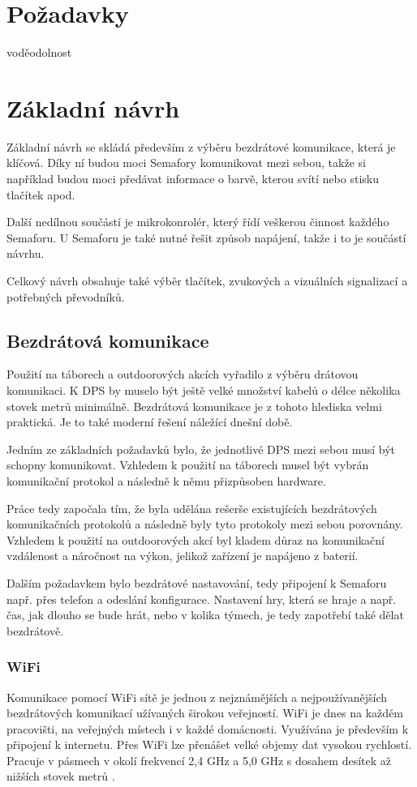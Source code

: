 \chapter{Požadavky}
voděodolnost


\chapter{Základní návrh}
Základní návrh se skládá především z výběru bezdrátové komunikace, která je klíčová. Díky ní budou moci Semafory komunikovat mezi 
sebou, takže si například budou moci předávat informace o barvě, kterou svítí nebo stisku tlačítek apod. 

Další nedílnou součástí je mikrokonrolér, který řídí veškerou činnost každého Semaforu. U Semaforu je také nutné řešit způsob napájení,
takže i to je součástí návrhu.

Celkový návrh obsahuje také výběr tlačítek, zvukových a vizuálních signalizací a potřebných převodníků. 


\section{Bezdrátová komunikace}
Použití na táborech a outdoorových akcích vyřadilo z výběru drátovou komunikaci. K DPS by muselo být ještě velké množství kabelů 
o délce několika stovek metrů minimálně. Bezdrátová komunikace je z tohoto hlediska velmi praktická. Je to také moderní řešení 
náležící dnešní době. 

Jedním ze základních požadavků bylo, že jednotlivé DPS mezi sebou musí být schopny komunikovat. Vzhledem k použití na táborech 
musel být vybrán komunikační protokol a následně k němu přizpůsoben hardware. 

Práce tedy započala tím, že byla udělána rešerše existujících bezdrátových komunikačních protokolů a následně byly tyto protokoly 
mezi sebou porovnány. Vzhledem k použití na outdoorových akcí byl kladem důraz na komunikační vzdálenost a náročnost na výkon, 
jelikož zařízení je napájeno z baterií. 

Dalším požadavkem bylo bezdrátové nastavování, tedy připojení k Semaforu např. přes telefon a odeslání konfigurace. Nastavení hry,
která se hraje a např. čas, jak dlouho se bude hrát, nebo v kolika týmech, je tedy zapotřebí také dělat bezdrátově. 

\subsection{WiFi}
Komunikace pomocí WiFi sítě je jednou z nejznámějších a nejpoužívanějších bezdrátových komunikací užívaných širokou veřejností. 
WiFi je dnes na každém pracovišti, na veřejných místech i v každé domácnosti. Využívána je především k připojení k internetu. 
Přes WiFi lze přenášet velké objemy dat vysokou rychlostí. Pracuje v pásmech v okolí frekvencí 2,4 GHz a 5,0 GHz s dosahem 
desítek až nižších stovek metrů \cite{Bezdrat_muni}.

